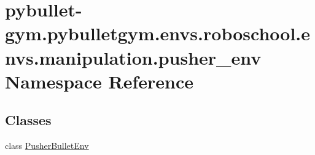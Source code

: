 \hypertarget{namespacepybullet-gym_1_1pybulletgym_1_1envs_1_1roboschool_1_1envs_1_1manipulation_1_1pusher__env}{}\section{pybullet-\/gym.pybulletgym.\+envs.\+roboschool.\+envs.\+manipulation.\+pusher\+\_\+env Namespace Reference}
\label{namespacepybullet-gym_1_1pybulletgym_1_1envs_1_1roboschool_1_1envs_1_1manipulation_1_1pusher__env}
\subsection*{Classes}
\begin{DoxyCompactItemize}
\item 
class \hyperlink{classpybullet-gym_1_1pybulletgym_1_1envs_1_1roboschool_1_1envs_1_1manipulation_1_1pusher__env_1_1_pusher_bullet_env}{Pusher\+Bullet\+Env}
\end{DoxyCompactItemize}
